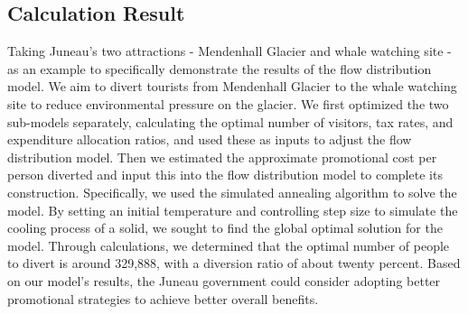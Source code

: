 \documentclass[12pt]{article}  %
\begin{document}
\subsection{Calculation Result}
Taking Juneau's two attractions - Mendenhall Glacier and whale watching site - as an example to specifically demonstrate the results of the flow distribution model.
We aim to divert tourists from Mendenhall Glacier to the whale watching site to reduce environmental pressure on the glacier. We first optimized the two sub-models separately, calculating the optimal number of visitors, tax rates, and expenditure allocation ratios, and used these as inputs to adjust the flow distribution model. Then we estimated the approximate promotional cost per person diverted and input this into the flow distribution model to complete its construction.
Specifically, we used the simulated annealing algorithm to solve the model. By setting an initial temperature and controlling step size to simulate the cooling process of a solid, we sought to find the global optimal solution for the model.
Through calculations, we determined that the optimal number of people to divert is around 329,888, with a diversion ratio of about twenty percent. Based on our model's results, the Juneau government could consider adopting better promotional strategies to achieve better overall benefits.
\end{document}
